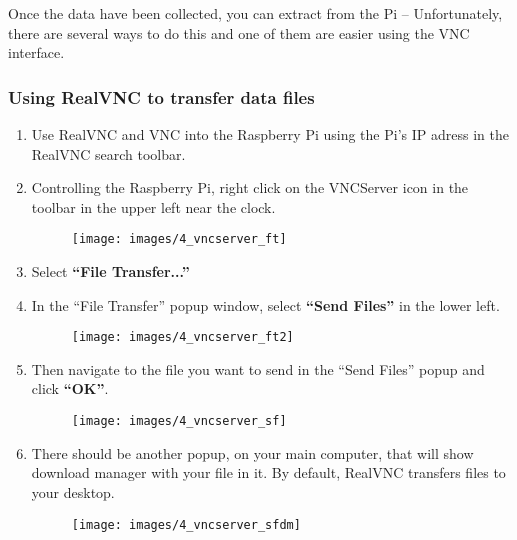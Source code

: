 \documentclass{article}\usepackage[]{graphicx}\usepackage[]{xcolor}
\begin{document}
    Once the data have been collected, you can extract from the Pi -- Unfortunately, there are several ways to do this and one of them are easier using the VNC interface.
    
\subsubsection{Using RealVNC to transfer data files}

\begin{enumerate}

\item Use RealVNC and VNC into the Raspberry Pi using the Pi's IP adress in the RealVNC search toolbar.

\item Controlling the Raspberry Pi, right click on the VNCServer icon in the toolbar in the upper left near the clock.
\begin{figure}[h]
\centering
\texttt{[image: images/4\_vncserver\_ft]}
\caption{}
\label{fig:vncserverfiletransfer}
\end{figure}

\item Select \textbf{``File Transfer...''}

\item In the ``File Transfer'' popup window, select \textbf{``Send Files''} in the lower left.
\begin{figure}[h]
\centering
\texttt{[image: images/4\_vncserver\_ft2]}
\caption{}
\label{fig:vncserverfiletransfer2}
\end{figure}

\item Then navigate to the file you want to send in the ``Send Files'' popup and click \textbf{``OK''}.
\begin{figure}[h!]
\centering
\texttt{[image: images/4\_vncserver\_sf]}
\caption{}
\label{fig:vncserversendfiles}
\end{figure}

\item There should be another popup, on your main computer, that will show download manager with your file in it. By default, RealVNC transfers files to your desktop.
\begin{figure}[h!]
\centering
\texttt{[image: images/4\_vncserver\_sfdm]}

\label{fig:vncserverdownloadmanager}
\end{figure}

\end{enumerate}
\end{document}
